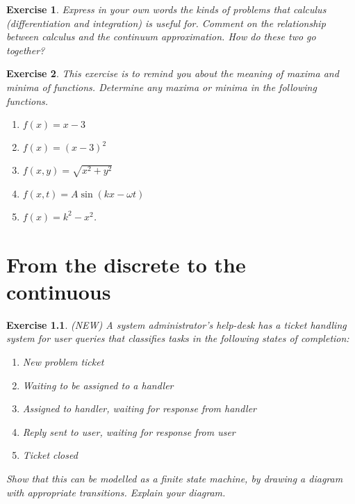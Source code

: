 \documentclass{book}
\newtheorem{exercise}{Exercise}
\begin{document}
\begin{exercise}
Express in your own words the kinds of problems that calculus
(differentiation and integration) is useful for. Comment on the relationship
between calculus and the continuum approximation. How do these two go together?
\end{exercise}
\begin{solution}
\end{solution}


\begin{exercise}
This exercise is to remind you about the meaning of maxima and minima
of functions. Determine any maxima or minima in the following functions.
\begin{enumerate}
\item $f(x) = x-3$
\item $f(x) = (x-3)^2$
\item $f(x,y) = \sqrt{x^2+y^2}$
\item $f(x,t) = A\sin(kx-\omega t)$
\item $f(x) = k^2-x^2$.
\end{enumerate} 
\end{exercise}
\begin{solution}
\end{solution}



\chapter{From the discrete to the continuous}



\begin{exercise} 
(NEW) A system administrator's help-desk has a ticket handling system
for user queries that classifies tasks in the following states of
completion:
\begin{enumerate}
\item New problem ticket
\item Waiting to be assigned to a handler
\item Assigned to handler, waiting for response from handler
\item Reply sent to user, waiting for response from user
\item Ticket closed
\end{enumerate}
Show that this can be modelled as a finite state machine, by drawing a
diagram with appropriate transitions. Explain your diagram.
\end{exercise}
\begin{solution}
\end{solution}
\end{document}
